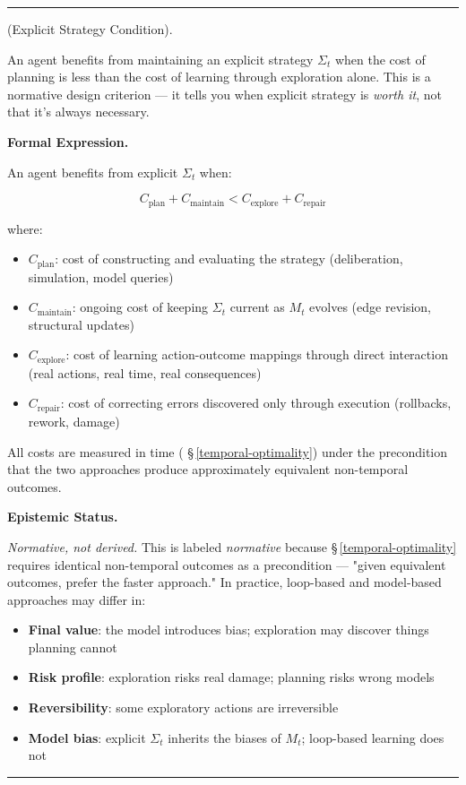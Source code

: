 \documentclass[11pt,oneside]{article}
\newcounter{claim}[section]
\renewcommand{\theclaim}{\thesection.\arabic{claim}}
\newenvironment{segment}[2]{%
  \refstepcounter{claim}%
  \bigskip\noindent\hrule\smallskip
  \noindent{\bfseries #1~\theclaim}\enskip(#2).\par\smallskip
  \noindent\ignorespaces
}{%
  \par\smallskip\noindent\hrule\bigskip
}
\newenvironment{normative}[1][]{\begin{segment}{Normative}{#1}}{\end{segment}}
\begin{document}
\begin{normative}[Explicit Strategy Condition]
\label{explicit-strategy-condition}
An agent benefits from maintaining an explicit strategy $\Sigma_t$ when the cost of planning is less than the cost of learning through exploration alone. This is a normative design criterion — it tells you when explicit strategy is \textit{worth it}, not that it's always necessary.



\medskip\noindent\textbf{Formal Expression.}



An agent benefits from explicit $\Sigma_t$ when:

$$C_{\text{plan}} + C_{\text{maintain}} < C_{\text{explore}} + C_{\text{repair}}$$

where:
\begin{itemize}
  \item $C_{\text{plan}}$: cost of constructing and evaluating the strategy (deliberation, simulation, model queries)
  \item $C_{\text{maintain}}$: ongoing cost of keeping $\Sigma_t$ current as $M_t$ evolves (edge revision, structural updates)
  \item $C_{\text{explore}}$: cost of learning action-outcome mappings through direct interaction (real actions, real time, real consequences)
  \item $C_{\text{repair}}$: cost of correcting errors discovered only through execution (rollbacks, rework, damage)
\end{itemize}


All costs are measured in time ( \S\,\ref{temporal-optimality}) under the precondition that the two approaches produce approximately equivalent non-temporal outcomes.


\medskip\noindent\textbf{Epistemic Status.}


\textit{Normative, not derived.} This is labeled \textit{normative} because \S\,\ref{temporal-optimality} requires identical non-temporal outcomes as a precondition — "given equivalent outcomes, prefer the faster approach." In practice, loop-based and model-based approaches may differ in:

\begin{itemize}
  \item \textbf{Final value}: the model introduces bias; exploration may discover things planning cannot
  \item \textbf{Risk profile}: exploration risks real damage; planning risks wrong models
  \item \textbf{Reversibility}: some exploratory actions are irreversible
  \item \textbf{Model bias}: explicit $\Sigma_t$ inherits the biases of $M_t$; loop-based learning does not
\end{itemize}



\end{normative}
\end{document}
